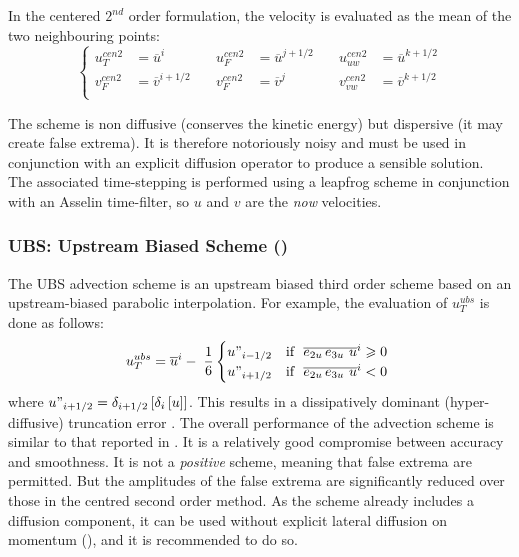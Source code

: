 \documentclass[../main/NEMO_manual]{subfiles}
\begin{document}
In the centered $2^{nd}$ order formulation, the velocity is evaluated as the mean of the two neighbouring points:
\begin{equation}
  \label{eq:dynadv_cen2}
  \left\{
    \begin{aligned}
      u_T^{cen2} &=\overline u^{i }       \quad &  u_F^{cen2} &=\overline u^{j+1/2}  \quad &  u_{uw}^{cen2} &=\overline u^{k+1/2}   \\
      v_F^{cen2} &=\overline v ^{i+1/2} \quad & v_F^{cen2} &=\overline v^j		\quad &  v_{vw}^{cen2} &=\overline v ^{k+1/2}  \\
    \end{aligned}
  \right.
\end{equation} 

The scheme is non diffusive (\ie conserves the kinetic energy) but dispersive (\ie it may create false extrema).
It is therefore notoriously noisy and must be used in conjunction with an explicit diffusion operator to
produce a sensible solution.
The associated time-stepping is performed using a leapfrog scheme in conjunction with an Asselin time-filter,
so $u$ and $v$ are the \emph{now} velocities.

\subsubsection{UBS: Upstream Biased Scheme (\protect{})}
\label{subsec:DYN_adv_ubs}

The UBS advection scheme is an upstream biased third order scheme based on
an upstream-biased parabolic interpolation.
For example, the evaluation of $u_T^{ubs} $ is done as follows:
\begin{equation}
  \label{eq:dynadv_ubs}
  u_T^{ubs} =\overline u ^i-\;\frac{1}{6}
  \begin{cases}
    u"_{i-1/2}& 	\text{if $\ \overline{e_{2u}\,e_{3u} \ u}^i  \geqslant 0$ } 	\\
    u"_{i+1/2}& 	\text{if $\ \overline{e_{2u}\,e_{3u} \ u}^i  < 0$ }
  \end{cases}
\end{equation}
where $u"_{i+1/2} =\delta_{i+1/2} \left[ {\delta_i \left[ u \right]} \right]$.
This results in a dissipatively dominant (\ie hyper-diffusive) truncation error
\citep{Shchepetkin_McWilliams_OM05}.
The overall performance of the advection scheme is similar to that reported in \citet{Farrow1995}.
It is a relatively good compromise between accuracy and smoothness.
It is not a \emph{positive} scheme, meaning that false extrema are permitted.
But the amplitudes of the false extrema are significantly reduced over those in the centred second order method.
As the scheme already includes a diffusion component, it can be used without explicit lateral diffusion on momentum 
(\ie {}\forcode{ = }),
and it is recommended to do so.
\end{document}
